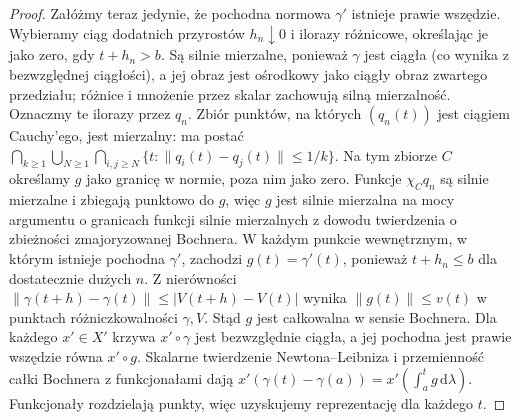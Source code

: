\begin{proof}
Załóżmy teraz jedynie, że pochodna normowa $\gamma'$
istnieje prawie wszędzie. Wybieramy ciąg dodatnich
przyrostów $h_n\downarrow0$ i ilorazy różnicowe,
określając je jako zero, gdy $t+h_n>b$. Są silnie
mierzalne, ponieważ $\gamma$ jest ciągła (co wynika
z bezwzględnej ciągłości), a jej obraz jest ośrodkowy
jako ciągły obraz zwartego przedziału; różnice
i mnożenie przez skalar zachowują silną mierzalność.
Oznaczmy te ilorazy przez $q_n$. Zbiór punktów, na
których $(q_n(t))$ jest ciągiem Cauchy'ego, jest mierzalny:
ma postać $\bigcap_{k\ge1}\bigcup_{N\ge1}
\bigcap_{i,j\ge N}\{t:\|q_i(t)-q_j(t)\|\le1/k\}$.
Na tym zbiorze $C$ określamy $g$ jako granicę w normie,
poza nim jako zero. Funkcje $\chi_Cq_n$ są silnie
mierzalne i zbiegają punktowo do $g$, więc $g$ jest
silnie mierzalna na mocy argumentu o granicach
funkcji silnie mierzalnych z dowodu twierdzenia
o zbieżności zmajoryzowanej Bochnera. W każdym punkcie
wewnętrznym, w którym istnieje pochodna $\gamma'$,
zachodzi $g(t)=\gamma'(t)$, ponieważ $t+h_n\le b$
dla dostatecznie dużych $n$. Z nierówności
$\|\gamma(t+h)-\gamma(t)\|\le|V(t+h)-V(t)|$
wynika $\|g(t)\|\le v(t)$ w punktach różniczkowalności
$\gamma,V$. Stąd $g$ jest całkowalna w sensie Bochnera.
Dla każdego $x'\in X'$ krzywa $x'\circ\gamma$
jest bezwzględnie ciągła, a jej pochodna jest prawie
wszędzie równa $x'\circ g$. Skalarne twierdzenie
Newtona--Leibniza i przemienność całki Bochnera
z funkcjonałami dają
$x'(\gamma(t)-\gamma(a))=x'(\int_a^t g\,\mathrm d\lambda)$.
Funkcjonały rozdzielają punkty, więc uzyskujemy
reprezentację dla każdego $t$.
\end{proof}

